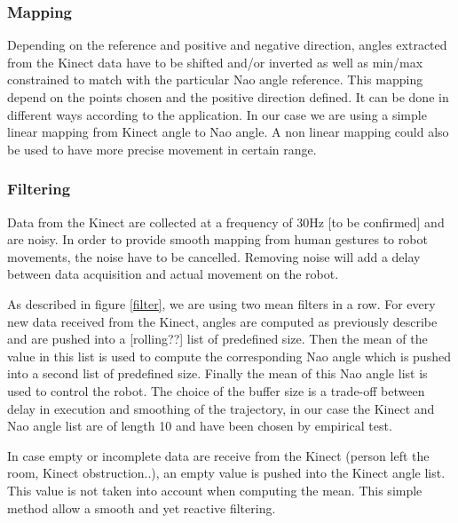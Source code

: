 \documentclass[a4paper,11pt]{article}
\newcommand{\todo}[1]{{\small\color{red}[#1]}}
\begin{document}
\subsubsection*{Mapping}

Depending on the reference and positive and negative direction, angles extracted from the Kinect data have to be shifted and/or inverted as well as min/max constrained to match with the particular Nao angle reference. 
This mapping depend on the points chosen and the positive direction defined. It can be done in different ways according to the application. In our case we are using a simple linear mapping from Kinect angle to Nao angle. A non linear mapping could also be used to have more precise movement in certain range.

\subsubsection*{Filtering}

Data from the Kinect are collected at a frequency of 30Hz \todo{to be confirmed} and are noisy. In order to provide smooth mapping from human gestures to robot movements, the noise have to be cancelled. Removing noise will add a delay between  data acquisition and actual movement on the robot.

As described in figure \ref{filter}, we are using two mean filters in a row. For every new data received from the Kinect, angles are computed as previously describe and are pushed into a \todo{rolling??} list of predefined size. Then the mean of the value in this list is used to compute the corresponding Nao angle which is pushed into a second list of predefined size. Finally the mean of this Nao angle list is used to control the robot. The choice of the buffer size is a trade-off between delay in execution and smoothing of the trajectory,  in our case the Kinect and Nao angle list are of length 10 and have been chosen by empirical test. 

In case empty or incomplete data are receive from the Kinect (person left the room, Kinect obstruction..), an empty value is pushed into the Kinect angle list. This value is not taken into account when computing the mean. This simple method allow a smooth and yet reactive filtering.
\end{document}
